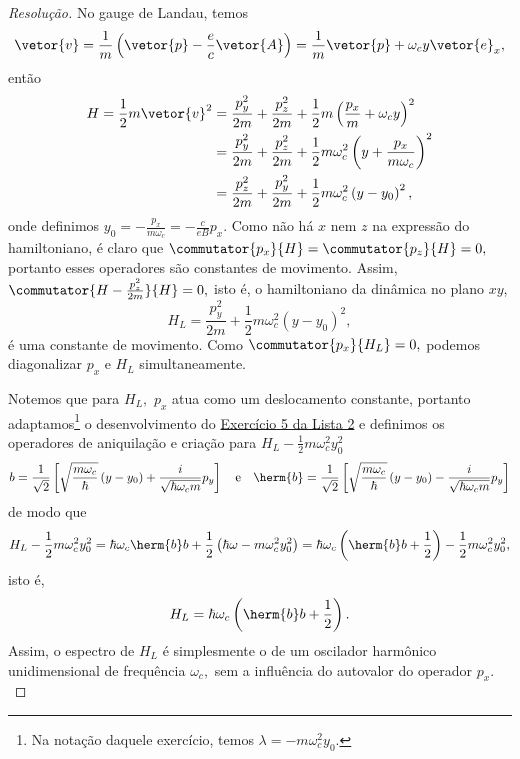 \begin{proof}[Resolução]
   No gauge de Landau, temos
   \begin{equation*}
      \vetor{v} = \frac1m \left(\vetor{p} - \frac{e}{c} \vetor{A}\right) = \frac1m\vetor{p} + \omega_c y \vetor{e}_x,
   \end{equation*}
   então
   \begin{align*}
      H = \frac12 m \vetor{v}^2 &= \frac{p_y^2}{2m} + \frac{p_z^2}{2m} + \frac12 m\left(\frac{p_x}{m} + \omega_c y\right)^2\\
                                &= \frac{p_y^2}{2m} + \frac{p_z^2}{2m} + \frac12 m \omega_c^2 \left(y + \frac{p_x}{m\omega_c}\right)^2\\
                                &= \frac{p_z^2}{2m} + \frac{p_y^2}{2m} + \frac12m \omega_c^2 \left(y - y_0\right)^2,
   \end{align*}
   onde definimos \(y_0 = - \frac{p_x}{m \omega_c} = -\frac{c}{e B} p_x.\) Como não há \(x\) nem \(z\) na expressão do hamiltoniano, é claro que \(\commutator{p_x}{H} = \commutator{p_z}{H} = 0,\) portanto esses operadores são constantes de movimento. Assim, \(\commutator{H - \frac{p_z^2}{2m}}{H} = 0,\) isto é, o hamiltoniano da dinâmica no plano \(xy\),
   \begin{equation*}
      H_L = \frac{p_y^2}{2m} + \frac12 m \omega_c^2 (y - y_0)^2,
   \end{equation*}
   é uma constante de movimento. Como \(\commutator{p_x}{H_L} = 0,\) podemos diagonalizar \(p_x\) e \(H_L\) simultaneamente.

   Notemos que para \(H_L,\) \(p_x\) atua como um deslocamento constante, portanto adaptamos\footnote{Na notação daquele exercício, temos \(\lambda = - m \omega_c^2 y_0.\)} o desenvolvimento do \href{https://github.com/louisradial/4305001-mecanica-quantica/releases/tag/lista2}{Exercício 5 da Lista 2} e definimos os operadores de aniquilação e criação para \(H_L - \frac12 m \omega_c^2 y_0^2\)
   \begin{equation*}
      b = \frac{1}{\sqrt{2}} \left[\sqrt{\frac{m \omega_c}{\hbar}}\left(y - y_0\right) + \frac{i}{\sqrt{\hbar \omega_c m}} p_y\right]
      \quad\text{e}\quad
      \herm{b} = \frac{1}{\sqrt{2}} \left[\sqrt{\frac{m \omega_c}{\hbar}}\left(y - y_0\right) - \frac{i}{\sqrt{\hbar \omega_c m}} p_y\right]
   \end{equation*}
   de modo que
   \begin{equation*}
      H_L - \frac12 m \omega_c^2 y_0^2 = \hbar\omega_c \herm{b}b + \frac12\left(\hbar\omega - m\omega_c^2 y_0^2\right) = \hbar\omega_c \left(\herm{b}b + \frac12\right) - \frac12 m \omega_c^2 y_0^2,
   \end{equation*}
   isto é,
   \begin{equation*}
      H_L = \hbar \omega_c \left(\herm{b} b + \frac12\right).
   \end{equation*}
   Assim, o espectro de \(H_L\) é simplesmente o de um oscilador harmônico unidimensional de frequência \(\omega_c,\) sem a influência do autovalor do operador \(p_x.\) 


\end{proof}
